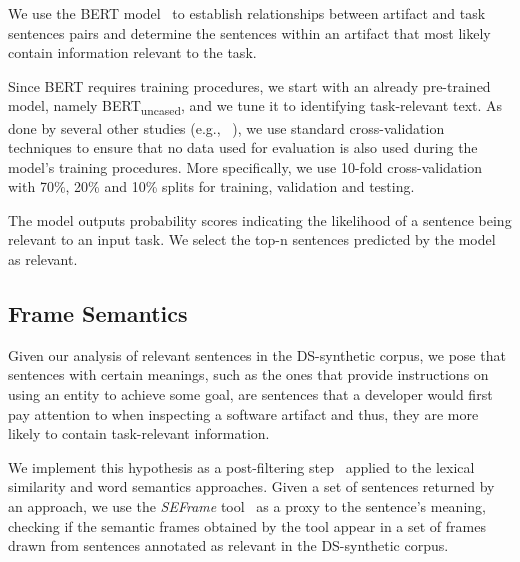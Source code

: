We use the BERT model~\cite{Devlin2018Bert} to establish relationships between artifact and task sentences pairs and determine 
the sentences within an artifact that most likely contain information relevant to the task.


Since BERT requires training procedures, we start with an already pre-trained model, namely BERT\textsubscript{uncased}, and we tune it to  identifying task-relevant text.
As done by several other studies (e.g., ~\cite{Chaparro2017, fucci2019, Petrosyan2015}), we use standard cross-validation techniques to ensure  that no data used for evaluation is also used
during the model's training procedures. More specifically, we use 10-fold cross-validation with 70\%, 20\% and 10\% splits for training, validation and testing. 


The model outputs probability scores indicating the likelihood of a sentence being relevant to an input task.
We select the top-n sentences predicted by the model as relevant.





\subsection{Frame Semantics}




Given our analysis of relevant sentences in the \acs{DS-synthetic} corpus, we pose that 
sentences with certain meanings, such as the ones that provide instructions on using an entity to achieve some goal,
are sentences that a developer would first pay attention to when inspecting a software artifact and thus, they are more likely to contain task-relevant information. 



We implement this hypothesis as a post-filtering step~\cite{Manning2009IR} applied to the lexical similarity and word semantics approaches.
Given a set of sentences returned by an approach, 
we use the \textit{SEFrame} tool~\cite{marques2021} as a proxy to the sentence's meaning,
checking if the semantic frames obtained by the tool appear in a set of frames drawn from  sentences annotated as relevant in the \acs{DS-synthetic} corpus.





